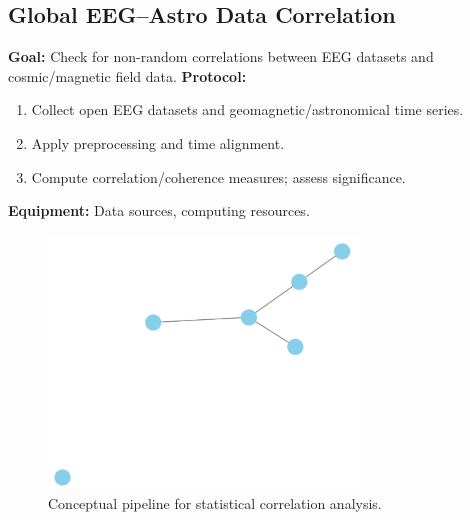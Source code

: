 \documentclass[11pt,a4paper]{article}
\begin{document}
\subsection{Global EEG--Astro Data Correlation}
\textbf{Goal:} Check for non-random correlations between EEG datasets and cosmic/magnetic field data.
\textbf{Protocol:}
\begin{enumerate}
 \item Collect open EEG datasets and geomagnetic/astronomical time series.
 \item Apply preprocessing and time alignment.
 \item Compute correlation/coherence measures; assess significance.
\end{enumerate}
\textbf{Equipment:} Data sources, computing resources.
\begin{figure}[h]
    \centering
    \includegraphics[width=0.75\textwidth]{figures/stats_schematic.png}
    \caption{Conceptual pipeline for statistical correlation analysis.}
\end{figure}
\end{document}
